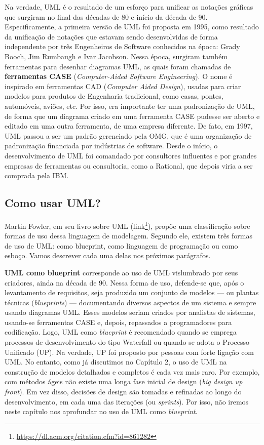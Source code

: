 \documentclass[
  11pt,
  twoside]{book}
\DeclareRobustCommand{\href}[2]{#2\footnote{\url{#1}}}
\begin{document}
 Na verdade, UML é o
resultado de um esforço para unificar as notações gráficas que surgiram
no final das décadas de 80 e início da década de 90. Especificamente, a
primeira versão de UML foi proposta em 1995, como resultado da
unificação de notações que estavam sendo desenvolvidas de forma
independente por três Engenheiros de Software conhecidos na época: Grady
Booch, Jim Rumbaugh e Ivar Jacobson. Nessa época, surgiram também
ferramentas para desenhar diagramas UML, as quais foram chamadas de
\textbf{ferramentas CASE} (\emph{Computer-Aided Software Engineering}).
O nome é inspirado em ferramentas CAD (\emph{Computer Aided Design}),
usadas para criar modelos para produtos de Engenharia tradicional, como
casas, pontes, automóveis, aviões, etc. Por isso, era importante ter uma
padronização de UML, de forma que um diagrama criado em uma ferramenta
CASE pudesse ser aberto e editado em uma outra ferramenta, de uma
empresa diferente. De fato, em 1997, UML passou a ser um padrão
gerenciado pela OMG, que é uma organização de padronização financiada
por indústrias de software. Desde o início, o desenvolvimento de UML foi
comandado por consultores influentes e por grandes empresas de
ferramentas ou consultoria, como a Rational, que depois viria a ser
comprada pela IBM.

\hypertarget{como-usar-uml}{%
\subsection*{Como usar UML?}\label{como-usar-uml}}

 Martin Fowler, em seu livro sobre UML
(\href{https://dl.acm.org/citation.cfm?id=861282}{link}), propõe uma
classificação sobre formas de uso dessa linguagem de modelagem. Segundo
ele, existem três formas de uso de UML: como blueprint, como linguagem
de programação ou como esboço. Vamos descrever cada uma delas nos
próximos parágrafos.

 \textbf{UML como blueprint} corresponde ao
uso de UML vislumbrado por seus criadores, ainda na década de 90. Nessa
forma de uso, defende-se que, após o levantamento de requisitos, seja
produzido um conjunto de modelos --- ou plantas técnicas
(\emph{blueprints}) --- documentando diversos aspectos de um sistema e
sempre usando diagramas UML. Esses modelos seriam criados por analistas
de sistemas, usando-se ferramentas CASE e, depois, repassados a
programadores para codificação. Logo, UML como \emph{blueprint} é
recomendado quando se emprega processos de desenvolvimento do tipo
Waterfall ou quando se adota o Processo Unificado (UP). Na verdade, UP
foi proposto por pessoas com forte ligação com UML. No entanto, como já
discutimos no Capítulo 2, o uso de UML na construção de modelos
detalhados e completos é cada vez mais raro. Por exemplo, com métodos
ágeis não existe uma longa fase inicial de design (\emph{big design up
front}). Em vez disso, decisões de design são tomadas e refinadas ao
longo do desenvolvimento, em cada uma das iterações (ou \emph{sprints}).
Por isso, não iremos neste capítulo nos aprofundar no uso de UML como
\emph{blueprint}.
\end{document}
